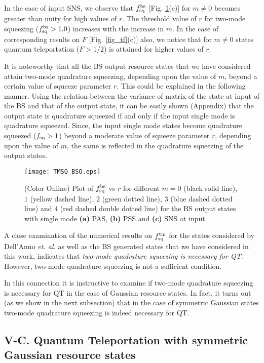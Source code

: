 \documentclass[letter,scriptaddress,twocolumn, prl,showkeys]{revtex4}
\begin{document}
In the case of input SNS, we observe that $f_{\rm{sq}}^{\rm{bs}}$ [Fig. \ref{fig_tmsq_bs}(c)] for $m\neq 0$ becomes greater than unity for high values of $r$. The threshold value of $r$ for two-mode squeezing ($f_{\rm{sq}}^{\rm{bs}}>1.0$) increases with the increase in $m$. In the case of corresponding results on $F$ [Fig. \ref{fig_tf}(c)] also, we notice that for $m\neq 0$ states quantum teleportation ($F>1/2$) is attained for higher values of $r$.

It is noteworthy that all the BS output resource states that we have considered attain two-mode quadrature squeezing, depending upon the value of $m$, beyond a certain value of squeeze parameter $r$.
This could be explained in the following manner.
Using the relation between the variance of matrix of the state at input of the BS and that of the output state, it can be easily shown (Appendix) that the output state is quadrature squeezed if and only if the input single mode is quadrature squeezed.
Since, the input single mode states become quadrature squeezed ($f_{\rm{sq}}>1$) beyond a moderate value of squeeze parameter $r$, depending upon the value of $m$, the same is reflected in the quadrature squeezing of the output states.
\begin{figure}[h]
\hspace*{-1 cm}
\texttt{[image: TMSQ\_BSO.eps]}
\caption{(Color Online) Plot of $f_{\rm{sq}}^{\rm{bs}}$ vs $r$ for different $m=0$ (black solid line), $1$ (yellow dashed line), $2$ (green dotted line), $3$ (blue dashed dotted line) and $4$ (red dashed double dotted line) for the BS output states with single mode {\bf (a)} PAS, {\bf (b)} PSS and {\bf (c)} SNS at input. \label{fig_tmsq_bs}}
\end{figure} 

A close examination of the numerical results on $f_{\rm{sq}}^{\rm{tm}}$ for the states considered by Dell'Anno {\em et. al.} \cite{tp_illuminati} as well as the BS generated states that we have considered in this work, indicates that {\em two-mode quadrature squeezing is necessary for QT}. However, two-mode quadrature squeezing is not a sufficient condition. 

In this connection it is instructive to examine if two-mode quadrature squeezing is necessary for QT in the case of Gaussian resource states.
In fact, it turns out (as we show in the next subsection) that in the case of symmetric Gaussian states two-mode quadrature squeezing is indeed necessary for QT.

\subsection*{V-C. Quantum Teleportation with symmetric Gaussian resource states}
\end{document}
